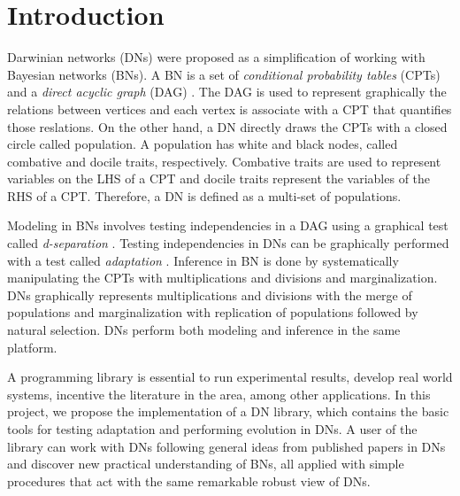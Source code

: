 %
\chapter{Introduction}
\label{sec:intro}


Darwinian networks (DNs) \cite{butzOliveiraSantosCai15} were proposed as a simplification of working with Bayesian networks (BNs).
A BN is a set of \emph{conditional probability tables} (CPTs) and a \emph{direct acyclic graph} (DAG) \cite{pear88}.
The DAG is used to represent graphically the relations between vertices and each vertex is associate with a CPT that quantifies those reslations.
On the other hand, a DN directly draws the CPTs with a closed circle called population.
A population has white and black nodes, called combative and docile traits, respectively.
Combative traits are used to represent variables on the LHS of a CPT and docile traits represent the variables of the RHS of a CPT.
Therefore, a DN is defined as a multi-set of populations.

Modeling in BNs involves testing independencies in a DAG using a graphical test called \emph{d-separation} \cite{pear88}.
Testing independencies in DNs can be graphically performed with a test called \emph{adaptation} \cite{butzOliveiraSantosCai15}.
Inference in BN is done by systematically manipulating the CPTs with multiplications and divisions and marginalization.
DNs graphically represents multiplications and divisions with the merge of populations and marginalization with replication of populations followed by natural selection.
DNs perform both modeling and inference in the same platform.

A programming library is essential to run experimental results, develop real world systems, incentive the literature in the area, among other applications.
In this project, we propose the implementation of a DN library, which contains the basic tools for testing adaptation and performing evolution in DNs.
A user of the library can work with DNs following general ideas from published papers in DNs \cite{butzOliveiraSantosCai15} and discover new practical understanding of BNs, all applied with simple procedures that act with the same remarkable robust view of DNs.

